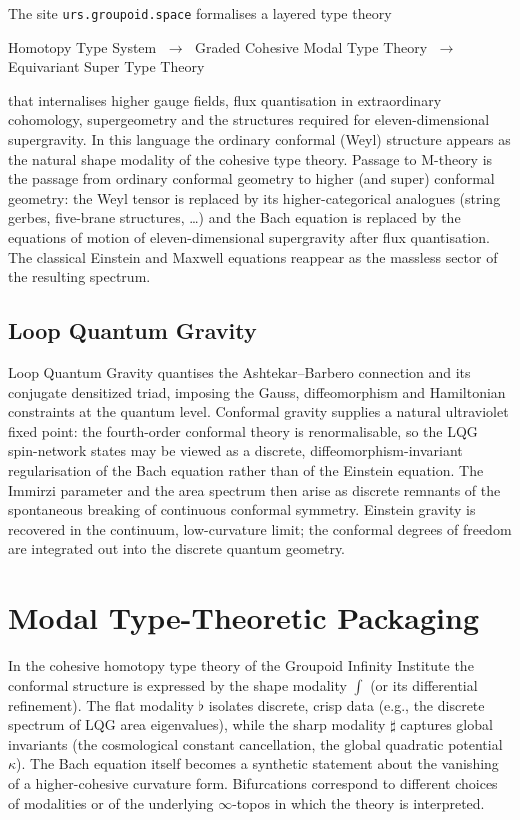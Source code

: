 \documentclass{article}
\begin{document}
The site \texttt{urs.groupoid.space} formalises a layered type theory
\begin{center}
Homotopy Type System \(\;\to\;\) Graded Cohesive Modal Type Theory \(\;\to\;\) Equivariant Super Type Theory
\end{center}
that internalises higher gauge fields, flux quantisation in extraordinary cohomology, supergeometry and the structures required for eleven-dimensional supergravity. In this language the ordinary conformal (Weyl) structure appears as the natural shape modality of the cohesive type theory. Passage to M-theory is the passage from ordinary conformal geometry to higher (and super) conformal geometry: the Weyl tensor is replaced by its higher-categorical analogues (string gerbes, five-brane structures, \ldots) and the Bach equation is replaced by the equations of motion of eleven-dimensional supergravity after flux quantisation. The classical Einstein and Maxwell equations reappear as the massless sector of the resulting spectrum.

\subsection{Loop Quantum Gravity}

Loop Quantum Gravity quantises the Ashtekar--Barbero connection and its conjugate densitized triad, imposing the Gauss, diffeomorphism and Hamiltonian constraints at the quantum level. Conformal gravity supplies a natural ultraviolet fixed point: the fourth-order conformal theory is renormalisable, so the LQG spin-network states may be viewed as a discrete, diffeomorphism-invariant regularisation of the Bach equation rather than of the Einstein equation. The Immirzi parameter and the area spectrum then arise as discrete remnants of the spontaneous breaking of continuous conformal symmetry. Einstein gravity is recovered in the continuum, low-curvature limit; the conformal degrees of freedom are integrated out into the discrete quantum geometry.

\section{Modal Type-Theoretic Packaging}
\label{sec:modal}

In the cohesive homotopy type theory of the Groupoid Infinity Institute the conformal structure is expressed by the shape modality \(\int\) (or its differential refinement). The flat modality \(\flat\) isolates discrete, crisp data (e.g., the discrete spectrum of LQG area eigenvalues), while the sharp modality \(\sharp\) captures global invariants (the cosmological constant cancellation, the global quadratic potential \(\kappa\)). The Bach equation itself becomes a synthetic statement about the vanishing of a higher-cohesive curvature form. Bifurcations correspond to different choices of modalities or of the underlying \(\infty\)-topos in which the theory is interpreted.
\end{document}
